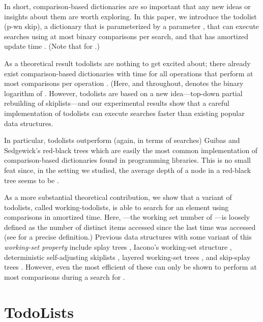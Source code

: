\documentclass{patmorin}
\begin{document}
In short, comparison-based dictionaries are so important that any
new ideas or insights about them are worth exploring.  In this paper,
we introduce the todolist (p-wn skip),
a dictionary that is parameterized by a parameter , 
that can execute searches using at most  binary
comparisons per search, and that has amortized update time .  (Note that  for .)

As a theoretical result todolists are nothing to get excited about; there
already exist comparison-based dictionaries with  time for all
operations that perform at most  comparisons per
operation \cite{andersson.lai:fast,fagerberg:binary}. (Here, and throughout,
 denotes the binary logarithm of . However, todolists
are based on a new idea---top-down partial rebuilding of skiplists---and
our experimental results show that a careful implementation of todolists
can execute searches faster than existing popular data structures.

In particular, todolists outperform (again, in terms of searches) Guibas
and Sedgewick's red-black trees \cite{guibas.sedgewick:dichromatic} which are
easily the most common implementation of comparison-based dictionaries
found in programming libraries. This is no small feat since, in the
setting we studied, the average depth of a node in a red-black tree
seems to be  \cite{sedgewick:left-leaning}.

As a more substantial theoretical contribution, we show that a variant of todolists, called working-todolists, is able to search for
an element  using  comparisons
in  amortized time.  Here, ---the
working set number of ---is loosely defined as the number of
distinct items accessed since the last time  was accessed (see
 for a precise definition.)  Previous data
structures with some variant of this \emph{working-set property}
include splay trees \cite{sleator.tarjan:self-adjusting}, Iacono's
working-set structure \cite{iacono:alternatives,badoiu.cole.ea:unified},
deterministic self-adjusting skiplists \cite{bose.douieb.ea:dynamic},
layered working-set trees \cite{bose.douieb.ea:layered}, and skip-splay
trees \cite{derryberry.sleator:skip-splay}.  However, even the most
efficient of these can only be shown to perform at most 
comparisons during a search for .

\section{TodoLists}
\end{document}
